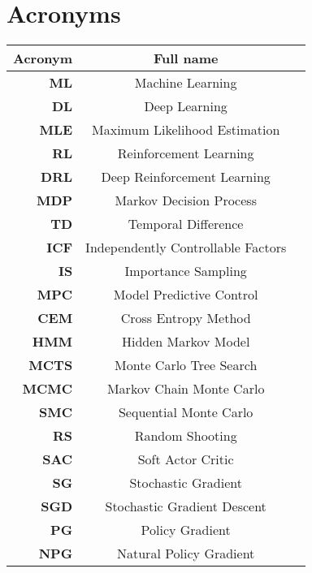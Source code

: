 \section*{Acronyms}
\begin{table}[H]%
\begin{center}%
\begin{tabular}{r c >{\raggedright\arraybackslash}p{10cm}}
\toprule
\textbf{Acronym} & \textbf{Full name}\\
\midrule
\textbf{ML} & Machine Learning\\
\textbf{DL} & Deep Learning\\
    \textbf{MLE} & Maximum Likelihood Estimation\\
\textbf{RL} & Reinforcement Learning\\
\textbf{DRL} & Deep Reinforcement Learning\\
\textbf{MDP} & Markov Decision Process\\
    \textbf{TD} & Temporal Difference\\
\textbf{ICF} & Independently Controllable Factors\\

\textbf{IS} & Importance Sampling\\
\textbf{MPC} & Model Predictive Control\\
    \textbf{CEM} & Cross Entropy Method\\
\textbf{HMM} & Hidden Markov Model\\
\textbf{MCTS} & Monte Carlo Tree Search\\
\textbf{MCMC} & Markov Chain Monte Carlo\\
    \textbf{SMC} & Sequential Monte Carlo\\
    \textbf{RS} & Random Shooting\\
    \textbf{SAC} & Soft Actor Critic\\
    \textbf{SG} & Stochastic Gradient\\
    \textbf{SGD} & Stochastic Gradient Descent\\
\textbf{PG} & Policy Gradient\\
\textbf{NPG} & Natural Policy Gradient\\
\bottomrule
\end{tabular}
\end{center}
\label{tab:acronyms}
\end{table}


